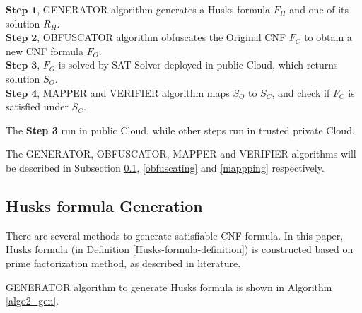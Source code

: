 \documentclass[conference]{IEEEtran}
\begin{document}
$\textbf{Step 1}$, GENERATOR algorithm generates a Husks formula $F_H$ and one of its solution $R_H$.\\
$\textbf{Step 2}$, OBFUSCATOR algorithm obfuscates the Original CNF $F_C$ to obtain a new CNF formula $F_O$.\\
$\textbf{Step 3}$, $F_O$ is solved by SAT Solver deployed in public Cloud, which returns solution $S_O$.\\
$\textbf{Step 4}$, MAPPER and VERIFIER algorithm maps $S_O$ to $S_C$, and check if $F_C$ is satisfied under $S_C$.
% 
% 
% 

The \textbf{Step 3} run in public Cloud, while other steps run in trusted private Cloud.

The GENERATOR, OBFUSCATOR, MAPPER and VERIFIER algorithms will be described in Subsection \ref{genhusk}, \ref{obfuscating}
and \ref{mappping} respectively.

\subsection{Husks formula Generation}\label{genhusk}

There are several methods to generate satisfiable CNF formula\cite{microgenSAT,genSAT}.
In this paper, Husks formula (in Definition \ref{Husks-formula-definition}) is constructed based on prime factorization method,
as described in literature\cite{genSAT}.

GENERATOR algorithm to generate Husks formula is shown in Algorithm \ref{algo2_gen}.
%
%
\end{document}
